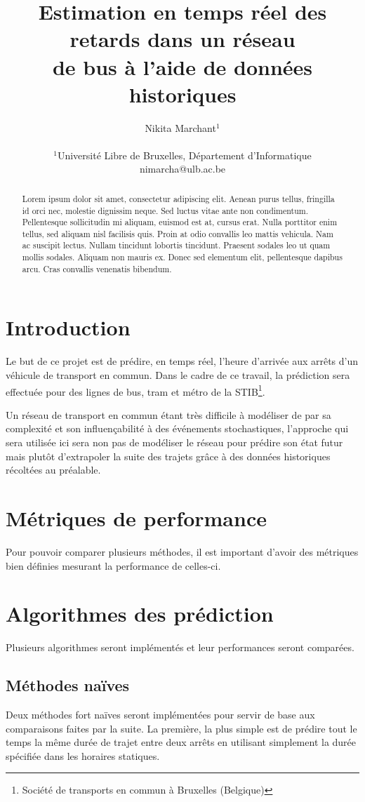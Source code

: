 \documentclass[letterpaper]{article}
\title{Estimation en temps réel des retards dans un réseau\\ de bus à l'aide de données historiques}
\author{Nikita Marchant$^{1}$\\
\mbox{}\\
$^1$Université Libre de Bruxelles, Département d'Informatique\\
nimarcha@ulb.ac.be}
\begin{document}
\maketitle

\begin{abstract}
Lorem ipsum dolor sit amet, consectetur adipiscing elit.
Aenean purus tellus, fringilla id orci nec, molestie dignissim neque.
Sed luctus vitae ante non condimentum. Pellentesque sollicitudin mi aliquam, euismod est at, cursus erat.
Nulla porttitor enim tellus, sed aliquam nisl facilisis quis.
Proin at odio convallis leo mattis vehicula. Nam ac suscipit lectus.
Nullam tincidunt lobortis tincidunt. Praesent sodales leo ut quam mollis sodales.
Aliquam non mauris ex. Donec sed elementum elit, pellentesque dapibus arcu.
Cras convallis venenatis bibendum.
\end{abstract}

\section{Introduction}

Le but de ce projet est de prédire, en temps réel, l'heure d'arrivée aux arrêts d'un véhicule de transport en commun.
Dans le cadre de ce travail, la prédiction sera effectuée pour des lignes de bus, tram et métro de la STIB\footnote{Société de transports en commun à Bruxelles (Belgique)}.

Un réseau de transport en commun étant très difficile à modéliser de par sa complexité et son influençabilité à des événements stochastiques,
l'approche qui sera utilisée ici sera non pas de modéliser le réseau pour prédire son état futur mais plutôt d'extrapoler la suite des trajets grâce à des données historiques récoltées au préalable.

\section{Métriques de performance}

Pour pouvoir comparer plusieurs méthodes,
il est important d'avoir des métriques bien définies mesurant la performance de celles-ci.


\section{Algorithmes des prédiction}
Plusieurs algorithmes seront implémentés et leur performances seront comparées.

\subsection{Méthodes naïves}
Deux méthodes fort naïves seront implémentées pour servir de base aux comparaisons faites par la suite.
La première, la plus simple est de prédire tout le temps la même durée de trajet entre deux arrêts en utilisant simplement la durée spécifiée dans les horaires statiques.
\end{document}
